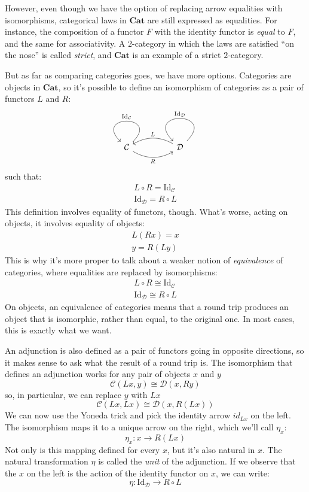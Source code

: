 \documentclass[DaoFP]{subfiles}
\begin{document}
However, even though we have the option of replacing arrow equalities with isomorphisms, categorical laws in $\mathbf{Cat}$ are still expressed as equalities. For instance, the composition of a functor $F$ with the identity functor is \emph{equal} to $F$, and the same for associativity. A $2$-category in which the laws are satisfied ``on the nose'' is called \emph{strict}, and $\mathbf{Cat}$ is an example of a strict $2$-category. 

But as far as comparing categories goes, we have more options. Categories are objects in $\mathbf{Cat}$, so it's possible to define an isomorphism of categories as a pair of functors $L$ and $R$:
\[
 \begin{tikzcd}
  \mathcal{C}
  \arrow[rr, bend right, "R"']
  \arrow[loop, "\text{Id}_{ \mathcal{C}} "']
  &&
  \mathcal{D}
  \arrow[ll, bend right, "L"']
  \arrow[loop, "\text{Id}_{ \mathcal{D}} "']
  \end{tikzcd}
\]
such that:
\begin{align*}
L \circ R = \text{Id}_{ \mathcal{C}} \\
\text{Id}_{ \mathcal{D}} = R \circ L 
\end{align*}
This definition involves equality of functors, though. What's worse, acting on objects, it involves equality of objects:
\begin{align*}
 L (R x) = x \\
 y = R (L y)
\end{align*}
This is why it's more proper to talk about a weaker notion of \emph{equivalence} of categories, where equalities are replaced by isomorphisms:
\begin{align*}
L \circ R \cong \text{Id}_{ \mathcal{C}} \\
 \text{Id}_{ \mathcal{D}} \cong R \circ L 
\end{align*}
On objects, an equivalence of categories means that a round trip produces an object that is isomorphic, rather than equal, to the original one. In most cases, this is exactly what we want.

An adjunction is also defined as a pair of functors going in opposite directions, so it makes sense to ask what the result of a round trip is. The isomorphism that defines an adjunction works for any pair of objects $x$ and $y$
\[  \mathcal{C} (L x, y) \cong \mathcal{D}( x , R y)\]
so, in particular, we can replace $y$ with $L x$
\[  \mathcal{C} (L x, L x) \cong \mathcal{D}( x , R (L x))\]
We can now use the Yoneda trick and pick the identity arrow $id_{L x}$ on the left. The isomorphism maps it to a unique arrow on the right, which we'll call $\eta_x$:
\[ \eta_x \colon x \to R ( L x) \]
Not only is this mapping defined for every $x$, but it's also natural in $x$. The natural transformation $\eta$ is called the \emph{unit} of the adjunction. If we observe that the $x$ on the left is the action of the identity functor on $x$, we can write:
\[ \eta \colon \text{Id}_{\mathcal{D}} \to R \circ L \]
\end{document}

